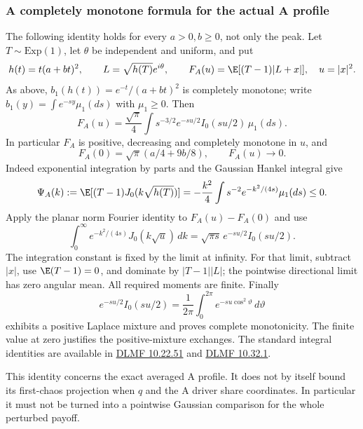 \subsubsection{A completely monotone formula for the actual A profile}
The following identity holds for every $a>0,b\ge0$, not only the peak.
Let $T\sim\mathrm{Exp}(1)$, let $\theta$ be independent and uniform,
and put
\[
 h(t)=t(a+bt)^2,\qquad L=\sqrt{h(T)}e^{i\theta},\qquad
 F_A(u)=\E[(T-1)|L+x|],\quad u=|x|^2.
\]
As above, $b_1(h(t))=e^{-t}/(a+bt)^2$ is completely monotone;
write $b_1(y)=\int e^{-sy}\mu_1(ds)$ with $\mu_1\ge0$.
Then
\begin{equation}\label{eq:cm-actual-a-profile}
 \boxed{F_A(u)=\frac{\sqrt\pi}{4}\int s^{-3/2}
       e^{-su/2}I_0(su/2)\,\mu_1(ds).}
\end{equation}
In particular $F_A$ is positive, decreasing and completely monotone
in $u$, and
\[
 F_A(0)=\sqrt\pi(a/4+9b/8),\qquad F_A(u)\longrightarrow0.
\]
Indeed exponential integration by parts and the Gaussian Hankel integral give
\[
 \Psi_A(k):=\E[(T-1)J_0(k\sqrt{h(T)})]
 =-\frac{k^2}{4}\int s^{-2}e^{-k^2/(4s)}\mu_1(ds)\le0.
\]
Apply the planar norm Fourier identity to $F_A(u)-F_A(0)$ and use
\[
 \int_0^\infty e^{-k^2/(4s)}J_0(k\sqrt u)\,dk
   =\sqrt{\pi s}\,e^{-su/2}I_0(su/2).
\]
The integration constant is fixed by the limit at infinity.
For that limit, subtract $|x|$, use $\E(T-1)=0$, and dominate by
$|T-1||L|$; the pointwise directional limit has zero angular mean.
All required moments are finite. Finally
\[
 e^{-su/2}I_0(su/2)=\frac1{2\pi}\int_0^{2\pi}
                   e^{-su\cos^2\vartheta}\,d\vartheta
\]
exhibits a positive Laplace mixture and proves complete monotonicity.
The finite value at zero justifies the positive-mixture exchanges.
The standard integral identities are available in
\href{https://dlmf.nist.gov/10.22.E51}{DLMF 10.22.51} and
\href{https://dlmf.nist.gov/10.32.E1}{DLMF 10.32.1}.

This identity concerns the exact averaged A profile. It does not by
itself bound its first-chaos projection when $q$ and the A driver share
coordinates. In particular it must not be turned into a pointwise
Gaussian comparison for the whole perturbed payoff.

